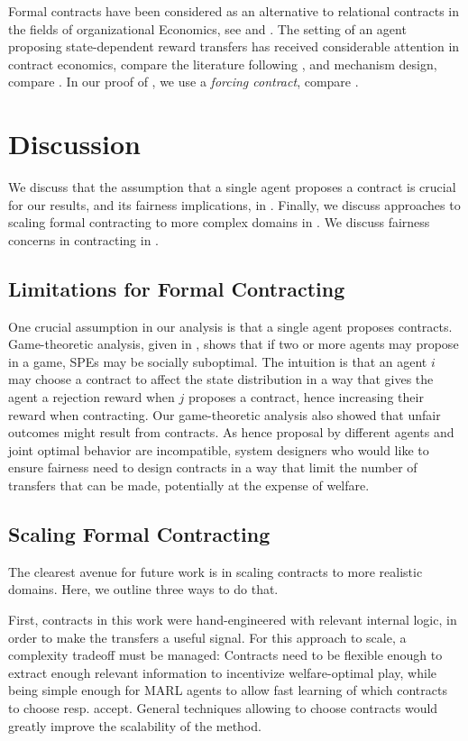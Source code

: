 \documentclass[referee,sn-basic]{sn-jnl}
\theoremstyle{thmstyleone}%
\theoremstyle{thmstyletwo}%
\theoremstyle{thmstylethree}%
\begin{document}
Formal contracts have been considered as an alternative to relational contracts in the fields of organizational Economics, see \cite{gil2017formal} and \cite[5.2.3]{gibbons2005four}. The setting of an agent proposing state-dependent reward transfers has received considerable attention in contract economics, compare the literature following \cite{mussa1978monopoly}, and mechanism design, compare \cite{hurwicz1973design,vickrey1961counterspeculation,myerson1981optimal}. In our proof of , we use a \emph{forcing contract}, compare \cite{holmstrom1979moral}.
\section{Discussion}\label{sec:conclusion}
We discuss that the assumption that a single agent proposes a contract is crucial for our results, and its fairness implications, in . Finally, we discuss approaches to scaling formal contracting to more complex domains in . We discuss fairness concerns in contracting in .
\subsection{Limitations for Formal Contracting}\label{subsec:limits}
One crucial assumption in our analysis is that a single agent proposes contracts. Game-theoretic analysis, given in , shows that if two or more agents may propose in a game, SPEs may be socially suboptimal. The intuition is that an agent $i$ may choose a contract to affect the state distribution in a way that gives the agent a rejection reward when $j$ proposes a contract, hence increasing their reward when contracting. Our game-theoretic analysis also showed that unfair outcomes might result from contracts. As hence proposal by different agents and joint optimal behavior are incompatible, system designers who would like to ensure fairness need to design contracts in a way that limit the number of transfers that can be made, potentially at the expense of welfare.

\subsection{Scaling Formal Contracting}\label{subsec:scaling}
The clearest avenue for future work is in scaling contracts to more realistic domains. Here, we outline three ways to do that.

First, contracts in this work were hand-engineered with relevant internal logic, in order to make the transfers a useful signal. For this approach to scale, a complexity tradeoff must be managed: Contracts need to be flexible enough to extract enough relevant information to incentivize welfare-optimal play, while being simple enough for MARL agents to allow fast learning of which contracts to choose resp. accept. General techniques allowing to choose contracts would greatly improve the scalability of the method.
\end{document}
